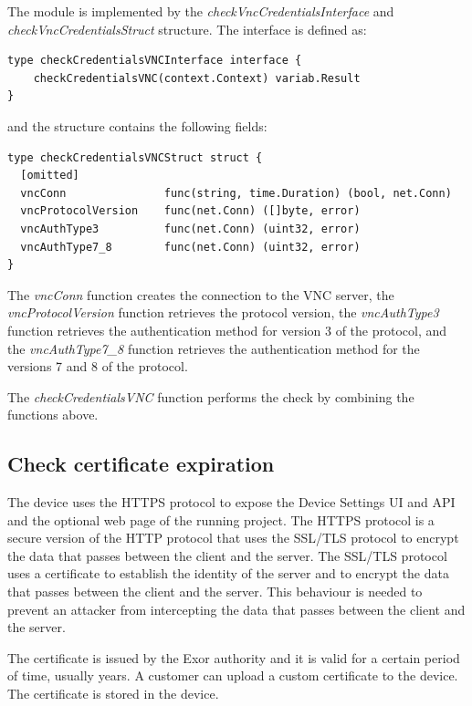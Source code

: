 The module is implemented by the \textit{checkVncCredentialsInterface} and \textit{checkVncCredentialsStruct} structure. The interface is defined as:

\begin{lstlisting}[style=golang]
type checkCredentialsVNCInterface interface {
	checkCredentialsVNC(context.Context) variab.Result
}
\end{lstlisting}

and the structure contains the following fields:

\begin{lstlisting}[style=golang]
type checkCredentialsVNCStruct struct {
  [omitted]
  vncConn               func(string, time.Duration) (bool, net.Conn)
  vncProtocolVersion    func(net.Conn) ([]byte, error)
  vncAuthType3          func(net.Conn) (uint32, error)
  vncAuthType7_8        func(net.Conn) (uint32, error)
}
\end{lstlisting}

The \textit{vncConn} function creates the connection to the VNC server, the \textit{vncProtocolVersion} function retrieves the protocol version, the \textit{vncAuthType3} function retrieves the authentication method for version 3 of the protocol, and the \textit{vncAuthType7\_8} function retrieves the authentication method for the versions 7 and 8 of the protocol.

The \textit{checkCredentialsVNC} function performs the check by combining the functions above.

\subsection{Check certificate expiration}

The device uses the HTTPS protocol to expose the Device Settings UI and API and the optional web page of the running project. The HTTPS protocol is a secure version of the HTTP protocol that uses the SSL/TLS protocol to encrypt the data that passes between the client and the server. The SSL/TLS protocol uses a certificate to establish the identity of the server and to encrypt the data that passes between the client and the server. This behaviour is needed to prevent an attacker from intercepting the data that passes between the client and the server.

The certificate is issued by the Exor authority and it is valid for a certain period of time, usually years. A customer can upload a custom certificate to the device. The certificate is stored in the device.


